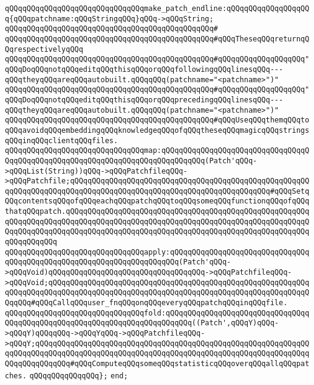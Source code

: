 \verb|qQQqqQQqqQQqqQQqqQQqqQQqqQQqqQQqmake_patch_endline:qQQqqQQqqQQqqQQqqQQq{qQQqpatchname:qQQqStringqQQq}qQQq->qQQqString;|\newline
\verb|qQQqqQQqqQQqqQQqqQQqqQQqqQQqqQQqqQQqqQQqqQQqqQQq#|\newline
\verb|qQQqqQQqqQQqqQQqqQQqqQQqqQQqqQQqqQQqqQQqqQQqqQQq#qQQqTheseqQQqreturnqQQqrespectivelyqQQq|\newline
\verb|qQQqqQQqqQQqqQQqqQQqqQQqqQQqqQQqqQQqqQQqqQQqqQQq#qQQqqQQqqQQqqQQqqQQq"qQQqDoqQQqnotqQQqeditqQQqthisqQQqorqQQqfollowingqQQqlinesqQQq---qQQqtheyqQQqareqQQqautobuilt.qQQqqQQq(patchname="<patchname>")"|\newline
\verb|qQQqqQQqqQQqqQQqqQQqqQQqqQQqqQQqqQQqqQQqqQQqqQQq#qQQqqQQqqQQqqQQqqQQq"qQQqDoqQQqnotqQQqeditqQQqthisqQQqorqQQqprecedingqQQqlinesqQQq---qQQqtheyqQQqareqQQqautobuilt.qQQqqQQq(patchname="<patchname>")"|\newline
\verb|qQQqqQQqqQQqqQQqqQQqqQQqqQQqqQQqqQQqqQQqqQQqqQQq#qQQqUseqQQqthemqQQqtoqQQqavoidqQQqembeddingqQQqknowledgeqQQqofqQQqtheseqQQqmagicqQQqstringsqQQqinqQQqclientqQQqfiles.|\newline
\newline
\newline
\verb|qQQqqQQqqQQqqQQqqQQqqQQqqQQqqQQqmap:qQQqqQQqqQQqqQQqqQQqqQQqqQQqqQQqqQQqqQQqqQQqqQQqqQQqqQQqqQQqqQQqqQQqqQQqqQQqqQQq(Patch'qQQq->qQQqList(String))qQQq->qQQqPatchfileqQQq->qQQqPatchfile;qQQqqQQqqQQqqQQqqQQqqQQqqQQqqQQqqQQqqQQqqQQqqQQqqQQqqQQqqQQqqQQqqQQqqQQqqQQqqQQqqQQqqQQqqQQqqQQqqQQqqQQqqQQqqQQqqQQq#qQQqSetqQQqcontentsqQQqofqQQqeachqQQqpatchqQQqtoqQQqsomeqQQqfunctionqQQqofqQQqthatqQQqpatch.qQQqqQQqqQQqqQQqqQQqqQQqqQQqqQQqqQQqqQQqqQQqqQQqqQQqqQQqqQQqqQQqqQQqqQQqqQQqqQQqqQQqqQQqqQQqqQQqqQQqqQQqqQQqqQQqqQQqqQQqqQQqqQQqqQQqqQQqqQQqqQQqqQQqqQQqqQQqqQQqqQQqqQQqqQQqqQQqqQQqqQQqqQQqqQQqqQQqqQQqqQQqqQQq|\newline
\verb|qQQqqQQqqQQqqQQqqQQqqQQqqQQqqQQqapply:qQQqqQQqqQQqqQQqqQQqqQQqqQQqqQQqqQQqqQQqqQQqqQQqqQQqqQQqqQQqqQQqqQQqqQQq(Patch'qQQq->qQQqVoid)qQQqqQQqqQQqqQQqqQQqqQQqqQQqqQQqqQQq->qQQqPatchfileqQQq->qQQqVoid;qQQqqQQqqQQqqQQqqQQqqQQqqQQqqQQqqQQqqQQqqQQqqQQqqQQqqQQqqQQqqQQqqQQqqQQqqQQqqQQqqQQqqQQqqQQqqQQqqQQqqQQqqQQqqQQqqQQqqQQqqQQqqQQqqQQqqQQq#qQQqCallqQQquser_fnqQQqonqQQqeveryqQQqpatchqQQqinqQQqfile.|\newline
\verb|qQQqqQQqqQQqqQQqqQQqqQQqqQQqqQQqfold:qQQqqQQqqQQqqQQqqQQqqQQqqQQqqQQqqQQqqQQqqQQqqQQqqQQqqQQqqQQqqQQqqQQqqQQqqQQq((Patch',qQQqY)qQQq->qQQqY)qQQqqQQq->qQQqYqQQq->qQQqPatchfileqQQq->qQQqY;qQQqqQQqqQQqqQQqqQQqqQQqqQQqqQQqqQQqqQQqqQQqqQQqqQQqqQQqqQQqqQQqqQQqqQQqqQQqqQQqqQQqqQQqqQQqqQQqqQQqqQQqqQQqqQQqqQQqqQQqqQQqqQQqqQQqqQQqqQQqqQQqqQQq#qQQqComputeqQQqsomeqQQqstatisticqQQqoverqQQqallqQQqpatches.|\newline
\verb|qQQqqQQqqQQqqQQq};|\newline
\verb|end;|\newline
\newline

